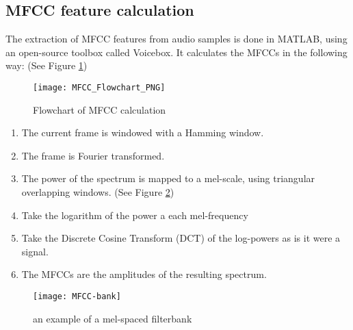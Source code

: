 \subsection{MFCC feature calculation}
The extraction of MFCC features from audio samples is done in MATLAB, using an open-source toolbox called Voicebox.
It calculates the MFCCs in the following way: (See Figure \ref{fig:mfccFlow})

\begin{figure}[H]
\centering
\texttt{[image: MFCC\_Flowchart\_PNG]}
\caption{Flowchart of MFCC calculation}
\label{fig:mfccFlow}
\end{figure}

\begin{enumerate}

\item
The current frame is windowed with a Hamming window.

\item
The frame is Fourier transformed.

\item
The power of the spectrum is mapped to a mel-scale, using triangular overlapping windows. (See Figure \ref{fig:mfccBank})

\item
Take the logarithm of the power a each mel-frequency

\item
Take the Discrete Cosine Transform (DCT) of the log-powers as is it were a signal.

\item
The MFCCs are the amplitudes of the resulting spectrum.

\end{enumerate}

\begin{figure}[H]
\centering
\texttt{[image: MFCC-bank]}
\caption{an example of a mel-spaced filterbank}
\label{fig:mfccBank}
\end{figure}

